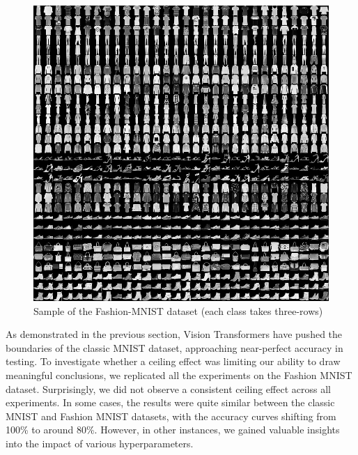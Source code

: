 \begin{figure}[H]
    \centering
    \includegraphics*[width=.6\textwidth]{figs/Transformers/fashion-mnist-sprite.png}
    \caption{Sample of the Fashion-MNIST dataset (each class takes three-rows)}
\end{figure}

As demonstrated in the previous section, Vision Transformers have pushed the boundaries of the classic MNIST dataset, approaching near-perfect accuracy in testing. To investigate whether a ceiling effect was limiting our ability to draw meaningful conclusions, we replicated all the experiments on the Fashion MNIST dataset. Surprisingly, we did not observe a consistent ceiling effect across all experiments. In some cases, the results were quite similar between the classic MNIST and Fashion MNIST datasets, with the accuracy curves shifting from 100\% to around 80\%. However, in other instances, we gained valuable insights into the impact of various hyperparameters.

